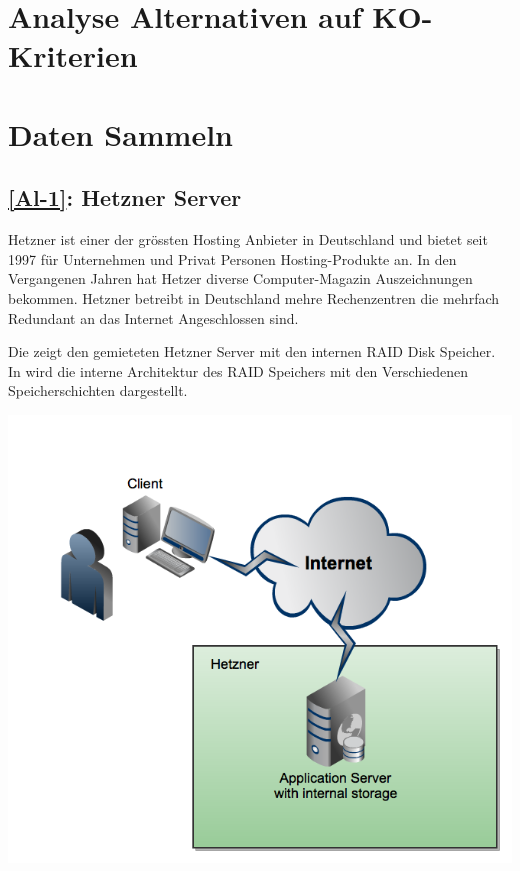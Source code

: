 \section{Analyse Alternativen auf KO-Kriterien}

\section{Daten Sammeln}
\subsection{\ref{Al-1}: Hetzner Server}
Hetzner ist einer der grössten Hosting Anbieter in Deutschland und bietet seit 1997 für Unternehmen und Privat Personen Hosting-Produkte an. In den Vergangenen Jahren hat Hetzer diverse Computer-Magazin Auszeichnungen bekommen. Hetzner betreibt in Deutschland mehre Rechenzentren die mehrfach Redundant an das Internet Angeschlossen sind.

Die  zeigt den gemieteten Hetzner Server mit den internen RAID Disk Speicher. In  wird die interne Architektur des RAID Speichers mit den Verschiedenen Speicherschichten dargestellt.

\begin{center}
\includegraphics[width=\linewidth, keepaspectratio = true]{media/Hetzner.png}
\end{center}

